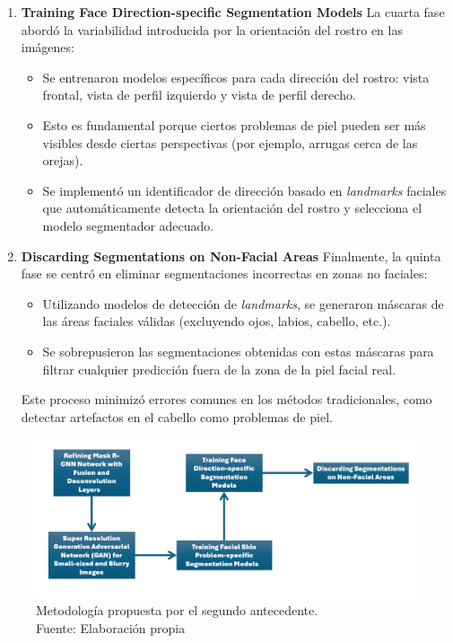 \begin{enumerate}[label=\textbf{\arabic*.}, leftmargin=2em]
	\item \textbf{Training Face Direction-specific Segmentation Models}
	La cuarta fase abordó la variabilidad introducida por la orientación del rostro en las imágenes:
	
	\begin{itemize}
		\item Se entrenaron modelos específicos para cada dirección del rostro: vista frontal, vista de perfil izquierdo y vista de perfil derecho.
		\item Esto es fundamental porque ciertos problemas de piel pueden ser más visibles desde ciertas perspectivas (por ejemplo, arrugas cerca de las orejas).
		\item Se implementó un identificador de dirección basado en \textit{landmarks} faciales que automáticamente detecta la orientación del rostro y selecciona el modelo segmentador adecuado.
	\end{itemize}
	
	\item \textbf{Discarding Segmentations on Non-Facial Areas}
	Finalmente, la quinta fase se centró en eliminar segmentaciones incorrectas en zonas no faciales:
	
	\begin{itemize}
		\item Utilizando modelos de detección de \textit{landmarks}, se generaron máscaras de las áreas faciales válidas (excluyendo ojos, labios, cabello, etc.).
		\item Se sobrepusieron las segmentaciones obtenidas con estas máscaras para filtrar cualquier predicción fuera de la zona de la piel facial real.
	\end{itemize}
	Este proceso minimizó errores comunes en los métodos tradicionales, como detectar artefactos en el cabello como problemas de piel.
	
\end{enumerate}

\begin{figure}[H]
	\begin{center}
		\includegraphics[width=1\textwidth]{2/figures/metoant2.png}
		\caption[Metodología propuesta por el segundo antecedente]{Metodología propuesta por el segundo antecedente.\\
			Fuente: Elaboración propia}
		\label{2:figant2}
	\end{center}
\end{figure}

